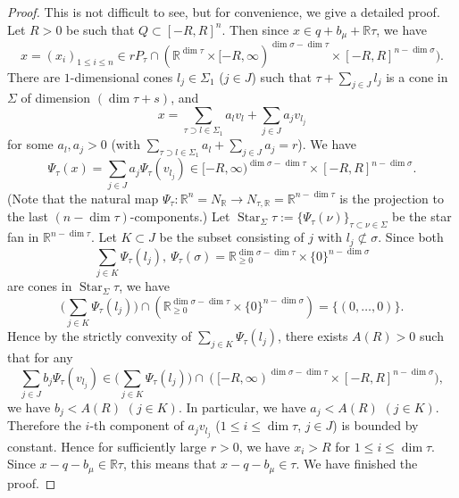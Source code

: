 \documentclass[10pt,a4paper]{amsart}
\def\R{\mathbb{R}}
\def\Star{\mathop{\mathrm{Star}}\nolimits}
\begin{document}
\begin{proof}
     This is not difficult to see, 
     but for convenience, we give a detailed proof.
      Let $R>0$ be such that $Q \subset [-R,R]^n$.
      Then since $x \in q+b_\mu + \R \tau$, we have 
      $$x =(x_i)_{1 \leq i \leq n} \in rP_{\tau} \cap ( \R^{\dim \tau } \times [-R,\infty)^{\dim \sigma - \dim \tau} \times [-R,R]^{n -\dim \sigma}).$$
      There are $1$-dimensional cones $l_j \in \Sigma_1$ ($j \in J$) 
         such that 
         $\tau + \sum_{ j \in J } l_j  $ 
         is a cone in $\Sigma$ of dimension $(\dim \tau +s)$,
         and 
      $$x = \sum_{ \tau \supset l \in \Sigma_1 } 
        a_l v_l + \sum_{ j \in J } a_j v_{l_j}$$
        for some $a_l, a_j >0 $ 
        (with 
      $ \sum_{ \tau \supset l \in \Sigma_1 } 
        a_l  + \sum_{ j \in J } a_j =r$).
     We have   
      $$\Psi_{\tau} (x) = \sum_{  j \in J } a_j \Psi_{\tau} (v_{l_j}) \in 
      [-R,\infty)^{\dim \sigma - \dim \tau} \times [-R,R]^{n -\dim \sigma}.$$
     (Note that the natural map 
     $\Psi_{\tau} \colon \R^n = N_\R \to N_{\tau,\R} = \R^{n-\dim \tau }$ is 
     the projection to the last $(n-\dim \tau)$-components.)
      Let $\Star_{\Sigma} \tau 
           := \{ \Psi_{\tau} (\nu)  \}_{\tau \subset \nu \in \Sigma }$ 
            be the star fan in $\R^{n-\dim \tau}$.
      Let $K \subset J$ be the subset consisting of  $j $ with $l_j \not\subset \sigma$.
      Since both
      $$ \sum_{j \in K} 
      \Psi_{\tau}(l_j), 
      \ 
      \Psi_\tau (\sigma) = 
      \R_{\geq 0}^{\dim \sigma - \dim \tau} \times \{0\}^{n -\dim \sigma} $$
      are 
      cones in $ \Star_{\Sigma} \tau$, 
      we have 
      $$\bigg( \sum_{j \in K} 
      \Psi_{\tau}(l_j)  \bigg)
       \cap 
      (\R_{\geq 0}^{\dim \sigma - \dim \tau} \times \{0\}^{n -\dim \sigma} ) 
       = \{ (0, \dots,0) \}. $$
      Hence
      by
      the strictly convexity of $\sum_{ j \in K } 
      \Psi_{\tau}(l_j) $, 
      there exists $A(R)>0$ 
      such that for any 
      $$ \sum_{  j \in J } b_j \Psi_{\tau} (v_{l_j})
       \in 
       \bigg(\sum_{j \in K} 
      \Psi_{\tau}(l_j)  \bigg)
      \cap 
      ([-R,\infty)^{\dim \sigma - \dim \tau} \times [-R,R]^{n -\dim \sigma}),  $$
      we have 
     $b_j < A(R)$ $(j \in K)$.
     In particular, we have 
     $a_j < A(R)$ $(j \in K)$.
       Therefore  
      the $i$-th component of $a_j v_{l_j}$ 
     ($1 \leq i \leq \dim \tau$, $j \in J$)
      is bounded by constant. 
      Hence for sufficiently large $r>0$, 
      we have $x_i >R$ for $1 \leq i \leq \dim \tau$.
      Since 
      $x - q-b_\mu \in \R \tau$, 
      this means that 
      $x - q- b_\mu \in \tau$.
      We have finished the proof.
   \end{proof}
\end{document}
